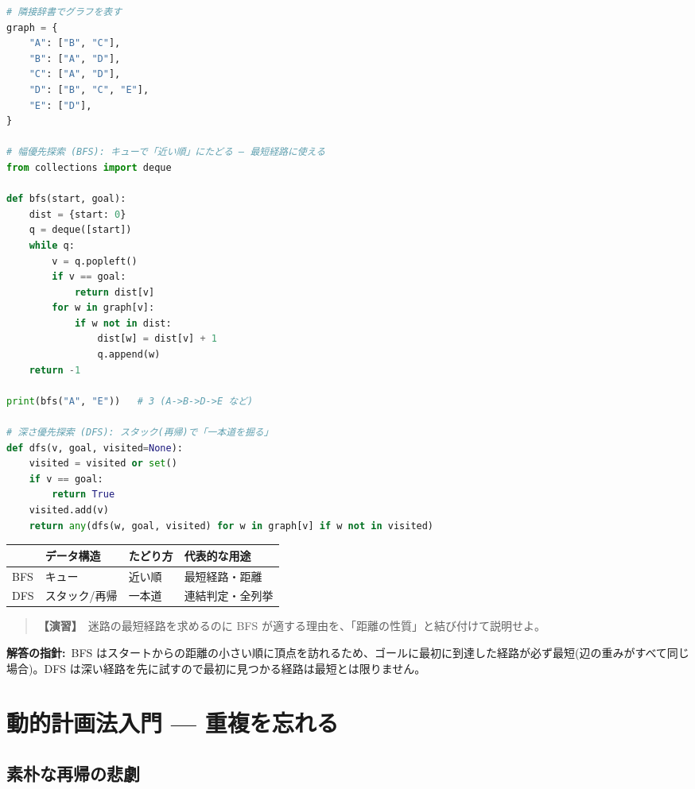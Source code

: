 \documentclass{article}
\begin{document}
\begin{lstlisting}[language=Python]
# 隣接辞書でグラフを表す
graph = {
    "A": ["B", "C"],
    "B": ["A", "D"],
    "C": ["A", "D"],
    "D": ["B", "C", "E"],
    "E": ["D"],
}

# 幅優先探索 (BFS): キューで「近い順」にたどる — 最短経路に使える
from collections import deque

def bfs(start, goal):
    dist = {start: 0}
    q = deque([start])
    while q:
        v = q.popleft()
        if v == goal:
            return dist[v]
        for w in graph[v]:
            if w not in dist:
                dist[w] = dist[v] + 1
                q.append(w)
    return -1

print(bfs("A", "E"))   # 3 (A->B->D->E など)

# 深さ優先探索 (DFS): スタック(再帰)で「一本道を掘る」
def dfs(v, goal, visited=None):
    visited = visited or set()
    if v == goal:
        return True
    visited.add(v)
    return any(dfs(w, goal, visited) for w in graph[v] if w not in visited)
\end{lstlisting}

\begin{center}
\begin{tabular}{|l|l|l|l|}
\hline
 & データ構造 & たどり方 & 代表的な用途 \\
\hline
BFS & キュー & 近い順 & 最短経路・距離 \\
DFS & スタック/再帰 & 一本道 & 連結判定・全列挙 \\
\hline
\end{tabular}
\end{center}

\begin{quote}
\textbf{【演習】}\ 迷路の最短経路を求めるのに BFS が適する理由を、「距離の性質」と結び付けて説明せよ。
\end{quote}

\textbf{解答の指針:}\ BFS はスタートからの距離の小さい順に頂点を訪れるため、ゴールに最初に到達した経路が必ず最短(辺の重みがすべて同じ場合)。DFS は深い経路を先に試すので最初に見つかる経路は最短とは限りません。

\section{動的計画法入門 — 重複を忘れる}

\subsection{素朴な再帰の悲劇}
\end{document}
